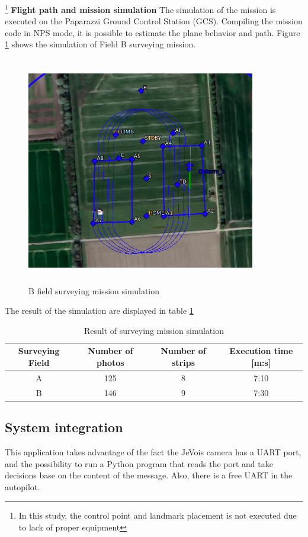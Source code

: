 \footnote{In this study, the control point and landmark placement is not executed due to lack of proper equipment} 
\textbf{Flight path and mission simulation}\newline
The simulation of the mission is executed on the Paparazzi Ground Control Station (GCS). Compiling the mission code in NPS mode, it is possible to estimate the plane behavior and path. Figure \ref{fig:bsim} shows the simulation of Field B surveying mission.
\begin{figure}[H]
\centering
\includegraphics[width=10cm,height=10cm,keepaspectratio]{imagenes/SimBField.png}
\caption{B field surveying mission simulation}
\label{fig:bsim}
\end{figure}
The result of the simulation are displayed in table \ref{Table:SimResult}
\begin{table}[H]
\centering
\begin{tabular}{|c|c|c|c|}
\hline
Surveying Field & Number of photos & Number of strips & Execution time [m:s] \\ \hline
A               & 125              & 8                & 7:10           \\ \hline
B               & 146              & 9                & 7:30           \\ \hline
\end{tabular}
\caption{Result of surveying mission simulation}
\label{Table:SimResult}
\end{table}
\subsection{System integration}
This application takes advantage of the fact the JeVois camera has a UART port, and the possibility to run a Python program that reads the port and take decisions base on the content of the message. Also, there is a free UART in the autopilot.

